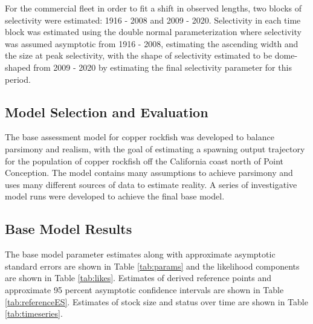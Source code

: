 \documentclass[11pt,
  english,
  a4paper,
]{article}
\begin{document}
For the commercial fleet in order to fit a shift in observed lengths, two blocks of selectivity were estimated: 1916 - 2008 and 2009 - 2020. Selectivity in each time block was estimated using the double normal parameterization where selectivity was assumed asymptotic from 1916 - 2008, estimating the ascending width and the size at peak selectivity, with the shape of selectivity estimated to be dome-shaped from 2009 - 2020 by estimating the final selectivity parameter for this period.

\leavevmode\tagmcend\tagstructend\par


\hypertarget{model-selection-and-evaluation}{%
\subsection{Model Selection and Evaluation}\label{model-selection-and-evaluation}}

\leavevmode\tagmcend\tagstructend


The base assessment model for copper rockfish was developed to balance parsimony and realism, with the goal of estimating a spawning output trajectory for the population of copper rockfish off the California coast north of Point Conception. The model contains many assumptions to achieve parsimony and uses many different sources of data to estimate reality. A series of investigative model runs were developed to achieve the final base model.

\leavevmode\tagmcend\tagstructend\par


\hypertarget{base-model-results}{%
\subsection{Base Model Results}\label{base-model-results}}

\leavevmode\tagmcend\tagstructend


The base model parameter estimates along with approximate asymptotic standard errors are shown in Table \ref{tab:params} and the likelihood components are shown in Table \ref{tab:likes}. Estimates of derived reference points and approximate 95 percent asymptotic confidence intervals are shown in Table \ref{tab:referenceES}. Estimates of stock size and status over time are shown in Table \ref{tab:timeseries}.
\end{document}
